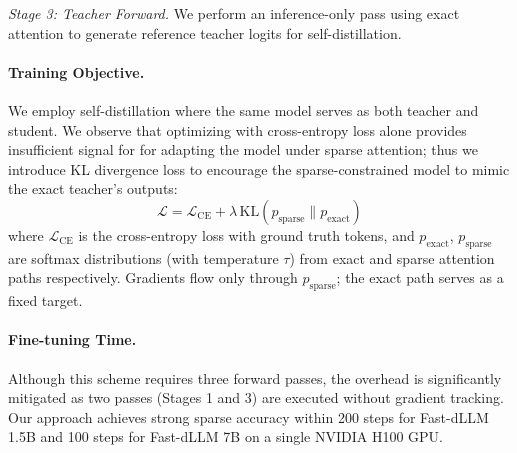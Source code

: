 \textit{Stage 3: Teacher Forward.}
We perform an inference-only pass using exact attention to generate reference teacher logits for self-distillation.



\paragraph{Training Objective.}
We employ self-distillation where the same model serves as both teacher and student.
We observe that optimizing with cross-entropy loss alone provides insufficient signal for for adapting the model under sparse attention; thus we introduce KL divergence loss to encourage the sparse-constrained model to mimic the exact teacher's outputs:
\begin{equation}
\mathcal{L} = \mathcal{L}_{\text{CE}} + \lambda\,\text{KL}(p_{\text{sparse}} \| p_{\text{exact}})
\end{equation}
where $\mathcal{L}_{\text{CE}}$ is the cross-entropy loss with ground truth tokens, and $p_{\text{exact}}$, $p_{\text{sparse}}$ are softmax distributions (with temperature $\tau$) from exact and sparse attention paths respectively. Gradients flow only through $p_{\text{sparse}}$; the exact path serves as a fixed target.

\paragraph{Fine-tuning Time.}
Although this scheme requires three forward passes, the overhead is significantly mitigated as two passes (Stages 1 and 3) are executed without gradient tracking. Our approach achieves strong 
sparse accuracy within 200 steps for Fast-dLLM 1.5B  and 100 steps for Fast-dLLM 7B on a single NVIDIA H100 GPU.

